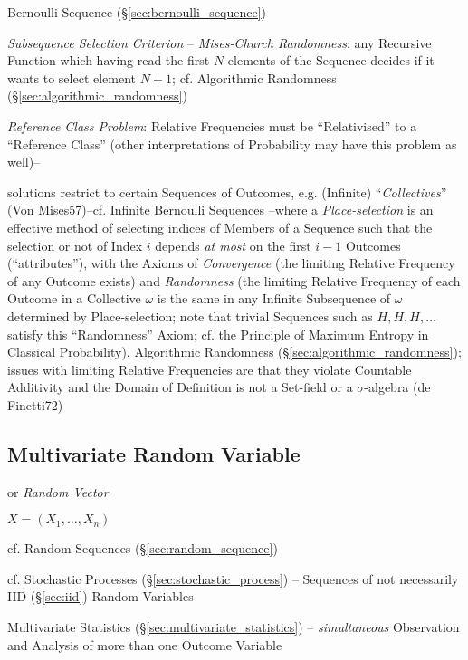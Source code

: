 Bernoulli Sequence (\S\ref{sec:bernoulli_sequence})

\emph{Subsequence Selection Criterion} -- \emph{Mises-Church Randomness}: any
Recursive Function which having read the first $N$ elements of the Sequence
decides if it wants to select element $N+1$; cf. Algorithmic Randomness
(\S\ref{sec:algorithmic_randomness})

\emph{Reference Class Problem}: Relative Frequencies must be ``Relativised'' to
a ``Reference Class'' (other interpretations of Probability may have this
problem as well)--

solutions restrict to certain Sequences of Outcomes, e.g. (Infinite)
``\emph{Collectives}'' (Von Mises57)--cf. Infinite Bernoulli Sequences --where a
\emph{Place-selection} is an effective method of selecting indices of Members of
a Sequence such that the selection or not of Index $i$ depends \emph{at most} on
the first $i-1$ Outcomes (``attributes''), with the Axioms of \emph{Convergence}
(the limiting Relative Frequency of any Outcome exists) and \emph{Randomness}
(the limiting Relative Frequency of each Outcome in a Collective $\omega$ is the
same in any Infinite Subsequence of $\omega$ determined by Place-selection; note
that trivial Sequences such as $H,H,H,\ldots$ satisfy this ``Randomness'' Axiom;
cf. the Principle of Maximum Entropy in Classical Probability), Algorithmic
Randomness (\S\ref{sec:algorithmic_randomness});
issues with limiting Relative Frequencies are that they violate Countable
Additivity and the Domain of Definition is not a Set-field or a $\sigma$-algebra
(de Finetti72)



\subsection{Multivariate Random Variable}\label{sec:random_vector}

or \emph{Random Vector}

$X = (X_1, \ldots, X_n)$

cf. Random Sequences (\S\ref{sec:random_sequence})

\fist cf. Stochastic Processes (\S\ref{sec:stochastic_process}) -- Sequences of
not necessarily IID (\S\ref{sec:iid}) Random Variables

\fist Multivariate Statistics (\S\ref{sec:multivariate_statistics}) --
\emph{simultaneous} Observation and Analysis of more than one Outcome Variable

